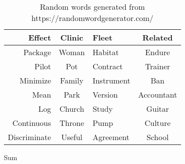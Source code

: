 \documentclass{article}
\begin{document}
\begin{table}
\begin{subtable}{\textwidth}
\begin{tabular}{|r c l c|}
            \hline
            Effect          & Clinic    & Fleet         & Related       \\
            \hline
            Package         & Woman     & Habitat       & Endure        \\
            Pilot           & Pot       & Contract      & Trainer       \\
            Minimize        & Family    & Instrument    & Ban           \\
            Mean            & Park      & Version       & Accountant    \\
            Log             & Church    & Study         & Guitar        \\
            Continuous      & Throne    & Pump          & Culture       \\
            Discriminate    & Useful    & Agreement     & School        \\
            \hline
        \end{tabular}
        \caption{Sum}
        \label{table:museum}
    \end{subtable}
    \caption{Random words generated from https://randomwordgenerator.com/}
    \label{table:layout}
\end{table}
\end{document}
